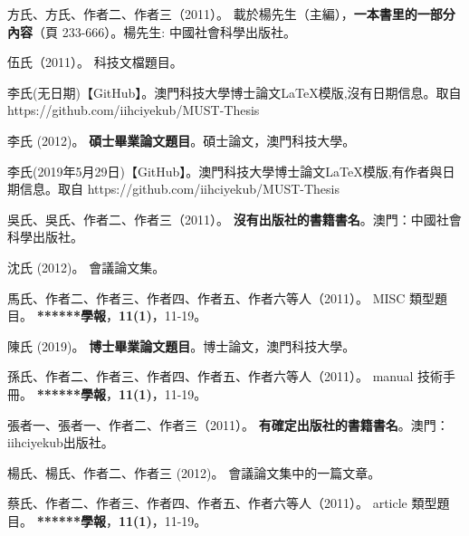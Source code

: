 
    \begin{thebibliography}{}


方氏、方氏、作者二、作者三（2011）。
\newblock  載於楊先生（主編），\textbf{一本書里的一部分內容}（頁 233-666）。楊先生: 中國社會科學出版社。

伍氏（2011）。
\newblock 科技文檔題目。

李氏(无日期)【GitHub】。澳門科技大學博士論文\LaTeX 模版,沒有日期信息。取自 https://github.com/iihciyekub/MUST-Thesis

李氏 (2012)。
\newblock \textbf{碩士畢業論文題目}。碩士論文，澳門科技大學。

李氏(2019年5月29日)【GitHub】。澳門科技大學博士論文\LaTeX 模版,有作者與日期信息。取自 https://github.com/iihciyekub/MUST-Thesis

吳氏、吳氏、作者二、作者三（2011）。
\newblock \textbf{ 沒有出版社的書籍書名}。澳門：中國社會科學出版社。

沈氏 (2012)。
\newblock 會議論文集。

馬氏、作者二、作者三、作者四、作者五、作者六等人（2011）。
\newblock MISC 類型題目。
\newblock \textbf{******學報}，\textbf{11}\textbf{(1)}，11-19。

陳氏 (2019)。
\newblock \textbf{博士畢業論文題目}。博士論文，澳門科技大學。

孫氏、作者二、作者三、作者四、作者五、作者六等人（2011）。
\newblock manual 技術手冊。
\newblock \textbf{******學報}，\textbf{11}\textbf{(1)}，11-19。

張者一、張者一、作者二、作者三（2011）。
\newblock \textbf{ 有確定出版社的書籍書名}。澳門：iihciyekub出版社。

楊氏、楊氏、作者二、作者三 (2012)。
\newblock 會議論文集中的一篇文章。

蔡氏、作者二、作者三、作者四、作者五、作者六等人（2011）。
\newblock article 類型題目。
\newblock \textbf{******學報}，\textbf{11}\textbf{(1)}，11-19。


\end{thebibliography}
